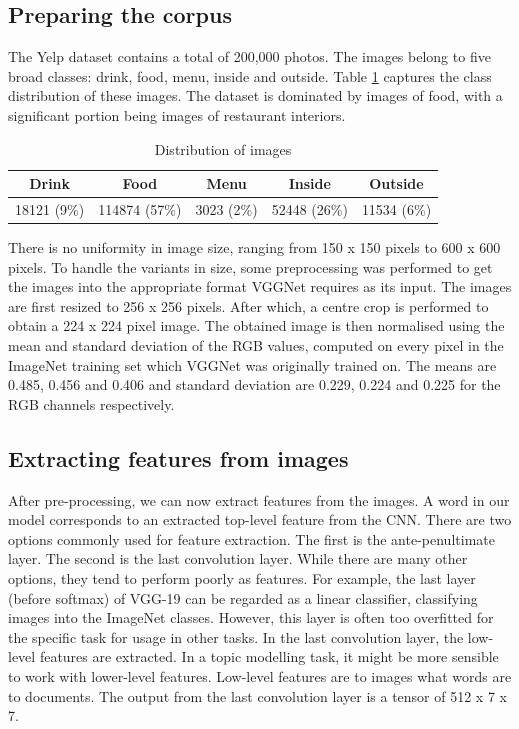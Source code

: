 \documentclass{article}
\begin{document}
\subsection{Preparing the corpus}
The Yelp dataset contains a total of 200,000 photos. The images belong to five broad classes: drink, food, menu, inside and outside. Table \ref{tab:images} captures the class distribution of these images. The dataset is dominated by images of food, with a significant portion being images of restaurant interiors. 

\begin{table}[h]
  \caption{Distribution of images}
  \label{tab:images}
  \centering
    \begin{tabular}{|c|c|c|c|c|}
    \hline
 Drink & Food & Menu & Inside & Outside \\ \hline
 18121 (9\%) & 114874 (57\%) & 3023 (2\%) & 52448 (26\%) & 11534 (6\%)  \\
 \hline
    \end{tabular}
\end{table}

There is no uniformity in image size, ranging from 150 x 150 pixels to 600 x 600 pixels. To handle the variants in size, some preprocessing was performed to get the images into the appropriate format VGGNet requires as its input. The images are first resized to 256 x 256 pixels. After which, a centre crop is performed to obtain a 224 x 224 pixel image. The obtained image is then normalised using the mean and standard deviation of the RGB values, computed on every pixel in the ImageNet training set which VGGNet was originally trained on. The means are 0.485, 0.456 and 0.406 and standard deviation are 0.229, 0.224 and 0.225 for the RGB channels respectively. 

\subsection{Extracting features from images}\label{extract}
After pre-processing, we can now extract features from the images. A word in our model corresponds to an extracted top-level feature from the CNN. There are two options commonly used for feature extraction. The first is the ante-penultimate layer. The second is the last convolution layer. While there are many other options, they tend to perform poorly as features. For example, the last layer (before softmax) of VGG-19 can be regarded as a linear classifier, classifying images into the ImageNet classes. However, this layer is often too overfitted for the specific task for usage in other tasks. In the last convolution layer, the low-level features are extracted. In a topic modelling task, it might be more sensible to work with lower-level features. Low-level features are to images what words are to documents. The output from the last convolution layer is a tensor of 512 x 7 x 7. 
\end{document}
